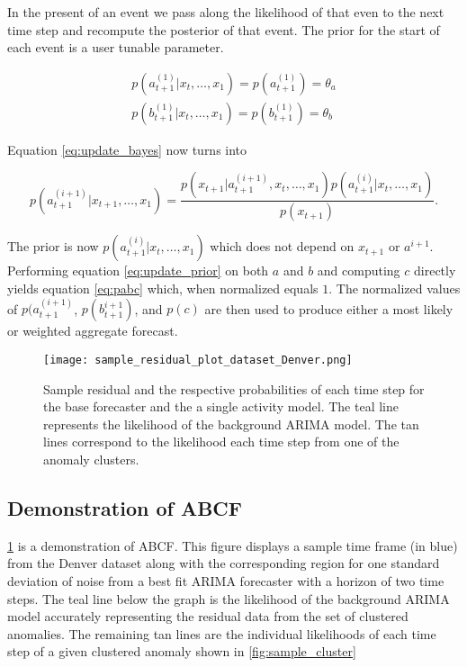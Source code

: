 In the present of an event we pass along the likelihood of that even to the next time step and recompute the posterior of that event.  The prior for the start of each event is a user tunable parameter.  

\begin{equation}
	\begin{split}
		p(a_{t + 1}^{(1)}|x_{t}, \ldots, x_{1}) = p(a_{t + 1}^{(1)}) = \theta_a \\
		p(b_{t + 1}^{(1)}|x_{t}, \ldots, x_{1}) = p(b_{t + 1}^{(1)}) = \theta_b
	\end{split}
\end{equation}

\noindent
Equation \ref{eq:update_bayes} now turns into 

\begin{equation}
p(a_{t + 1}^{(i + 1)}|x_{t + 1}, \ldots, x_{1}) =
		\frac{p(x_{t + 1}|a^{(i + 1)}_{t + 1}, x_{t}, \ldots, x_{1}) p(a_{t + 1}^{(i)}|x_{t}, \ldots, x_{1})}
	       {p(x_{t + 1})}.
\label{eq:update_prior}
\end{equation}

\noindent
The prior is now $p(a_{t + 1}^{(i)}|x_{t}, \ldots, x_{1})$ which does not depend on $x_{t + 1}$ or $a^{i + 1}$.  Performing equation \ref{eq:update_prior} on both $a$ and $b$ and computing $c$ directly yields equation \ref{eq:pabc} which, when normalized equals $1$.  The normalized values of $p(a_{t + 1}^{(i + 1)}$, $p(b_{t + 1}^{i + 1})$, and $p(c)$ are then used to produce either a most likely or weighted aggregate forecast.


\begin{figure}[!t]
	\begin{center}
		\texttt{[image: sample\_residual\_plot\_dataset\_Denver.png]}
	\end{center}
	\caption{Sample residual and the respective probabilities of each time step for the base forecaster and the a single activity model.  The teal line represents the likelihood of the background ARIMA model.  The tan lines correspond to the likelihood each time step from one of the anomaly clusters.}
	\label{fig:sample_abcf_residual}
\end{figure}

\subsection{Demonstration of ABCF}
\ref{fig:sample_abcf_residual} is a demonstration of ABCF.  This figure displays a sample time frame (in blue) from the Denver dataset along with the corresponding region for one standard deviation of noise from a best fit ARIMA forecaster with a horizon of two time steps.  The teal line below the graph is the likelihood of the background ARIMA model accurately representing the residual data from the set of clustered anomalies.  The remaining tan lines are the individual likelihoods of each time step of a given clustered anomaly shown in \ref{fig:sample_cluster}  

